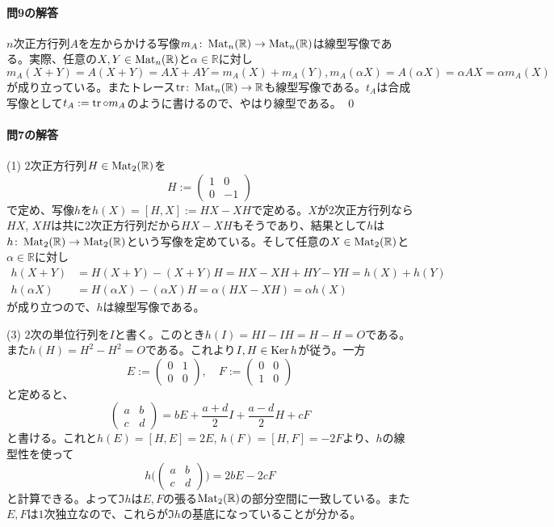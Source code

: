 \paragraph{問9の解答} $n$次正方行列$A$を左からかける写像$m_A\colon \operatorname{Mat}_n(\mathbb{R}) \rightarrow \operatorname{Mat}_n(\mathbb{R})$は線型写像である。実際、任意の$X, Y \in \operatorname{Mat}_n(\mathbb{R})$と$\alpha \in \mathbb{R}$に対し
\[
m_A(X + Y ) = A (X + Y) = AX + AY = m_A(X) + m_A(Y) , m_A(\alpha X) = A (\alpha X) = \alpha AX = \alpha m_A(X)
\]
が成り立っている。またトレース$\operatorname{tr}\colon \operatorname{Mat}_n(\mathbb{R}) \rightarrow \mathbb{R}$も線型写像である。$t_A$は合成写像として$t_A := \operatorname{tr} \circ m_A$のように書けるので、やはり線型である。 \qed

\paragraph{問7の解答}
(1) $2$次正方行列$H \in \operatorname{Mat}_2(\mathbb{R})$を
\[
H := 
\begin{pmatrix}
1 & 0 \\
0 & -1
\end{pmatrix}
\]
で定め、写像$h$を$h(X) = [H, X] := HX - XH$で定める。$X$が$2$次正方行列なら$HX$, $XH$は共に$2$次正方行列だから$HX - XH$もそうであり、結果として$h$は$h\colon \operatorname{Mat}_2(\mathbb{R}) \rightarrow \operatorname{Mat}_2(\mathbb{R})$という写像を定めている。そして任意の$X \in \operatorname{Mat}_2(\mathbb{R})$と$\alpha \in \mathbb{R}$に対し
\begin{align*}
h(X + Y) &= H (X + Y) - (X + Y) H = HX - XH + HY - YH = h(X) + h(Y) \\
h(\alpha X) &= H (\alpha X) - (\alpha X) H = \alpha (HX - XH) = \alpha h(X)
\end{align*}
が成り立つので、$h$は線型写像である。

\noindent (3) $2$次の単位行列を$I$と書く。このとき$h(I) = HI - IH = H - H = O$である。また$h(H) = H^2 - H^2 = O$である。これより$I, H \in \operatorname{Ker} h$が従う。一方
\[
E := 
\begin{pmatrix}
0 & 1 \\
0 & 0
\end{pmatrix}, \quad
F := 
\begin{pmatrix}
0 & 0 \\
1 & 0
\end{pmatrix}
\]
と定めると、
\[
\begin{pmatrix}
a & b \\
c & d
\end{pmatrix}
= 
bE + \frac{a + d}{2} I + \frac{a - d}{2} H + cF
\]
と書ける。これと$h(E) = [H, E] = 2E$, $h(F) = [H, F] = -2F$より、$h$の線型性を使って
\[
h
\Biggl(
\begin{pmatrix}
a & b \\
c & d
\end{pmatrix}
\Biggr)
= 2b E - 2cF
\]
と計算できる。よって$\Im h$は$E, F$の張る$\operatorname{Mat}_2(\mathbb{R})$の部分空間に一致している。また$E, F$は$1$次独立なので、これらが$\Im h$の基底になっていることが分かる。

